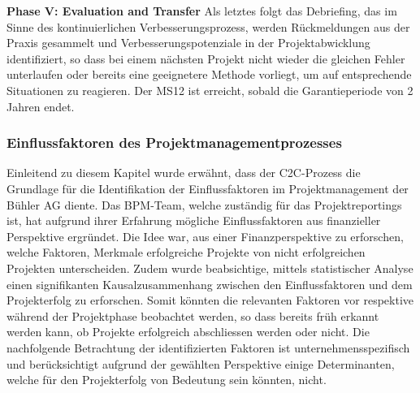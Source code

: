 \newline
\textbf{Phase V: Evaluation and Transfer}
\newline
Als letztes folgt das Debriefing, das im Sinne des kontinuierlichen Verbesserungsprozess, werden Rückmeldungen aus der Praxis gesammelt und Verbesserungspotenziale in der Projektabwicklung identifiziert, so dass bei einem nächsten Projekt nicht wieder die gleichen Fehler unterlaufen oder bereits eine geeignetere Methode vorliegt, um auf entsprechende Situationen zu reagieren. Der MS12 ist erreicht, sobald die Garantieperiode von 2 Jahren endet. 
\subsubsection{Einflussfaktoren des Projektmanagementprozesses}\label{zweizwei}
Einleitend zu diesem Kapitel wurde erwähnt, dass der C2C-Prozess die Grundlage für die Identifikation der Einflussfaktoren im Projektmanagement der Bühler AG diente. Das BPM-Team, welche zuständig für das Projektreportings ist, hat aufgrund ihrer Erfahrung mögliche Einflussfaktoren aus finanzieller Perspektive ergründet. Die Idee war, aus einer Finanzperspektive zu erforschen, welche Faktoren, Merkmale erfolgreiche Projekte von nicht erfolgreichen Projekten unterscheiden. Zudem wurde beabsichtige, mittels statistischer Analyse einen signifikanten Kausalzusammenhang zwischen den Einflussfaktoren und dem Projekterfolg zu erforschen. Somit könnten die relevanten Faktoren vor respektive während der Projektphase beobachtet werden, so dass bereits früh erkannt werden kann, ob Projekte erfolgreich abschliessen werden oder nicht. Die nachfolgende Betrachtung der identifizierten Faktoren ist unternehmensspezifisch und berücksichtigt aufgrund der gewählten Perspektive einige Determinanten, welche für den Projekterfolg von Bedeutung sein könnten, nicht. 
\newline
